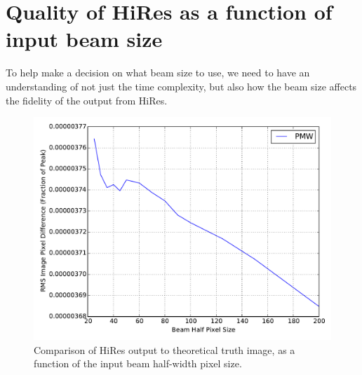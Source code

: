 \documentclass[a4paper]{article}
\numberwithin{equation}{section}
\begin{document}
\section{Quality of HiRes as a function of input beam size}

To help make a decision on what beam size to use, we need to have an understanding of not just the time complexity, but also how the beam size affects the fidelity of the output from HiRes.

\begin{figure}[H]
    \centering
    \includegraphics[width=0.85\linewidth]{beam-size.pdf}
    \caption{Comparison of HiRes output to theoretical truth image, as a function of the input beam half-width pixel size.}
    \label{hrtc}
\end{figure}


\end{document}
